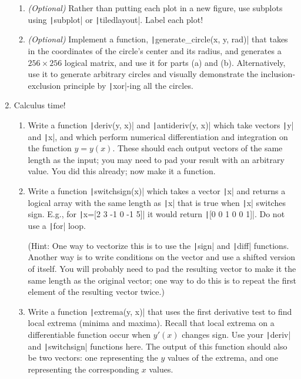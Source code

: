 \documentclass{article}
\begin{document}
\begin{enumerate}
\begin{enumerate}
  \item \textit{(Optional)} Rather than putting each plot in a new figure, use subplots using \texttt|subplot| or \texttt|tiledlayout|. Label each plot!
    
  \item \textit{(Optional)} Implement a function, \texttt|generate_circle(x, y, rad)| that takes in the coordinates of the circle's center and its radius, and generates a $256\times 256$ logical matrix, and use it for parts (a) and (b). Alternatively, use it to generate arbitrary circles and visually demonstrate the inclusion-exclusion principle by \texttt|xor|-ing all the circles.
  \end{enumerate}
  
  \clearpage
\item
  Calculus time!
  \begin{enumerate}
  \item Write a function \texttt|deriv(y, x)| and \texttt|antideriv(y, x)| which take vectors \texttt|y| and \texttt|x|, and which perform numerical differentiation and integration on the function $y=y(x)$. These should each output vectors of the same length as the input; you may need to pad your result with an arbitrary value. You did this already; now make it a function.
    
  \item Write a function \texttt|switchsign(x)| which takes a vector \texttt|x| and returns a logical array with the same length as \texttt|x| that is true when \texttt|x| switches sign. E.g., for \texttt|x=[2 3 -1 0 -1 5]| it would return \texttt|[0 0 1 0 0 1]|. Do not use a \texttt|for| loop.
    
    (Hint: One way to vectorize this is to use the \texttt|sign| and \texttt|diff| functions. Another way is to write conditions on the vector and use a shifted version of itself. You will probably need to pad the resulting vector to make it the same length as the original vector; one way to do this is to repeat the first element of the resulting vector twice.)
    
  \item Write a function \texttt|extrema(y, x)| that uses the first derivative test to find local extrema (minima and maxima). Recall that local extrema on a differentiable function occur when $y'(x)$ changes sign. Use your \texttt|deriv| and \texttt|switchsign| functions here. The output of this function should also be two vectors: one representing the $y$ values of the extrema, and one representing the corresponding $x$ values.
    

\end{enumerate}
\end{enumerate}
\end{document}

